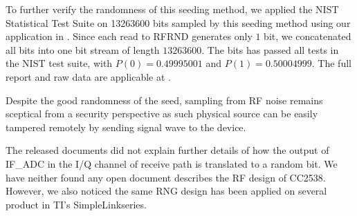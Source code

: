 To further verify the randomness of this seeding method, we applied the NIST Statistical Test Suite\cite{NISTTest} on 13263600 bits sampled by this seeding method using our application in \cite{prngtest}. Since each read to RFRND generates only $1$ bit, we concatenated all bits into one bit stream of length $13263600$. The bits has passed all tests in the NIST test suite, with $P(0) = 0.49995001$ and $P(1) = 0.50004999$. The full report and raw data are applicable at \cite{prngtest}.

Despite the good randomness of the seed, sampling from RF noise remains sceptical from a security perspective as such physical source can be easily tampered remotely by sending signal wave to the device.

The released documents did not explain further details of how the output of IF\_ADC in the I/Q channel of receive path is translated to a random bit. We have neither found any open document describes  the RF design of CC2538. However, we also noticed the same RNG design has been applied on several product in TI's SimpleLink\texttrademark series.